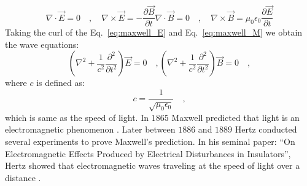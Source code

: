 \begin{subequations}
\begin{equation}
\label{eq:maxwell_E}
\nabla\cdot \vec{E}  = 0 \quad, \quad  \nabla\times\vec{E}   = -\frac{\partial\vec{B}}{\partial t}
\end{equation}
\begin{equation}
\label{eq:maxwell_M}
\nabla\cdot \vec{B}  = 0 \quad, \quad \nabla\times\vec{B}  =  \mu _0 \epsilon _0 \frac{\partial \vec{E}}{\partial t}
\end{equation}
\end{subequations}
Taking the curl of the Eq.~\eqref{eq:maxwell_E} and Eq.~\eqref{eq:maxwell_M} we obtain the wave equations:
\begin{subequations}
\begin{equation}
\label{eq:waveeq_E}
\left( \nabla ^2 + \frac{1}{c^2}\frac{\partial ^2}{\partial t^2}\right)\vec{E} = 0 \quad ,
\end{equation}
\begin{equation}
\label{eq:waveeq_B}
\left( \nabla ^2 + \frac{1}{c^2}\frac{\partial ^2}{\partial t^2}\right)\vec{B} = 0 \quad ,
\end{equation}
\end{subequations}
where $c$ is defined as:
\begin{equation}
\label{eq:speed_of_light}
c = \frac{1}{\sqrt{\mu _0 \epsilon _0}} \quad ,
\end{equation}
which is same as the speed of light. In $\mathrm{1865}$ Maxwell predicted that light is an electromagnetic phenomenon \cite{ClerkMaxwell_1865}. Later between $1886$ and $1889$ Hertz conducted several experiments to prove Maxwell's prediction. In his seminal paper: ``On Electromagnetic Effects Produced by Electrical Disturbances in Insulators'', Hertz showed that electromagnetic waves traveling at the speed of light over a distance \cite{dagostino1975}.

